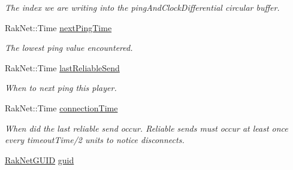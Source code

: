 \begin{DoxyCompactItemize}
\begin{DoxyCompactList}\small\item\em The index we are writing into the ping\-And\-Clock\-Differential circular buffer. \end{DoxyCompactList}\item 
\hypertarget{struct_rak_net_1_1_rak_peer_1_1_remote_system_struct_aef5cb3dd099cc1e40309ed2f23db3ab2}{Rak\-Net\-::\-Time \hyperlink{struct_rak_net_1_1_rak_peer_1_1_remote_system_struct_aef5cb3dd099cc1e40309ed2f23db3ab2}{next\-Ping\-Time}}\label{struct_rak_net_1_1_rak_peer_1_1_remote_system_struct_aef5cb3dd099cc1e40309ed2f23db3ab2}

\begin{DoxyCompactList}\small\item\em The lowest ping value encountered. \end{DoxyCompactList}\item 
\hypertarget{struct_rak_net_1_1_rak_peer_1_1_remote_system_struct_afaf8167643d88fb07cbd0a05a3433e91}{Rak\-Net\-::\-Time \hyperlink{struct_rak_net_1_1_rak_peer_1_1_remote_system_struct_afaf8167643d88fb07cbd0a05a3433e91}{last\-Reliable\-Send}}\label{struct_rak_net_1_1_rak_peer_1_1_remote_system_struct_afaf8167643d88fb07cbd0a05a3433e91}

\begin{DoxyCompactList}\small\item\em When to next ping this player. \end{DoxyCompactList}\item 
\hypertarget{struct_rak_net_1_1_rak_peer_1_1_remote_system_struct_ae80999ef54359f7d36095010e69a24a9}{Rak\-Net\-::\-Time \hyperlink{struct_rak_net_1_1_rak_peer_1_1_remote_system_struct_ae80999ef54359f7d36095010e69a24a9}{connection\-Time}}\label{struct_rak_net_1_1_rak_peer_1_1_remote_system_struct_ae80999ef54359f7d36095010e69a24a9}

\begin{DoxyCompactList}\small\item\em When did the last reliable send occur. Reliable sends must occur at least once every timeout\-Time/2 units to notice disconnects. \end{DoxyCompactList}\item 
\hypertarget{struct_rak_net_1_1_rak_peer_1_1_remote_system_struct_a9a01590c31b4bd76058bac91bc4e9ad0}{\hyperlink{struct_rak_net_1_1_rak_net_g_u_i_d}{Rak\-Net\-G\-U\-I\-D} \hyperlink{struct_rak_net_1_1_rak_peer_1_1_remote_system_struct_a9a01590c31b4bd76058bac91bc4e9ad0}{guid}}\label{struct_rak_net_1_1_rak_peer_1_1_remote_system_struct_a9a01590c31b4bd76058bac91bc4e9ad0}


\end{DoxyCompactItemize}
